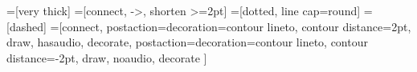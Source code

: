 =[very thick]
=[connect, ->, shorten >=2pt]
=[dotted, line cap=round]
=[dashed]
=[connect, 
  postaction={decoration={contour lineto, contour distance=2pt}, draw, hasaudio, decorate},
  postaction={decoration={contour lineto, contour distance=-2pt}, draw, noaudio, decorate}
]

\newcommand{\answer}[4][draw]{
  \path[flow, color#4, #1] (#2) -- node[midway, above, sloped] {#4} (#3);
}
\newcommand{\answeryes}[3][]{
  \ifstrempty{#1}{\answer{#2}{SIA-R#3-OK}{yes}}{\answer[#1]{#2}{SIA-R#3-OK}{yes}}
}
\newcommand{\answerno}[3][]{
  \ifstrempty{#1}{\answer{#2}{SIA-R#3-KO}{no}}{\answer[#1]{#2}{SIA-R#3-KO}{no}}
}
\newcommand{\answers}[3][]{
  \answeryes[#1]{#2}{#3}
  \answerno[#1]{#2}{#3}
}

\newcommand{\qref}[2][has-]{\texttt{#1#2}?}

\newcommand{\compositerule}[2]{
  SIA R#1 \\ Pass if any input rule passes \nodepart{two} Fails if all input rules fail \\ WCAG #2 also fails
}